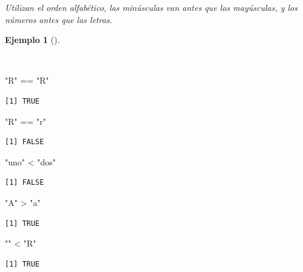 \documentclass[
  spanish,
  a4paper,
]{scrreport}
\newenvironment{Shaded}{\begin{snugshade}}{\end{snugshade}}
\newcommand{\SpecialCharTok}[1]{\textcolor[rgb]{0.37,0.37,0.37}{#1}}
\newcommand{\StringTok}[1]{\textcolor[rgb]{0.13,0.47,0.30}{#1}}
\theoremstyle{definition}
\theoremstyle{definition}
\newtheorem{example}{Ejemplo}[chapter]
\theoremstyle{remark}
\begin{document}
\emph{Utilizan el orden alfabético, las minúsculas van antes que las
mayúsculas, y los números antes que las letras.}

\begin{example}[]\protect\hypertarget{exm-operaciones-comparacion-cadenas}{}\label{exm-operaciones-comparacion-cadenas}

~

\begin{Shaded}
\begin{Highlighting}[]
\StringTok{"R"} \SpecialCharTok{==} \StringTok{"R"}
\end{Highlighting}
\end{Shaded}

\begin{verbatim}
[1] TRUE
\end{verbatim}

\begin{Shaded}
\begin{Highlighting}[]
\StringTok{"R"} \SpecialCharTok{==} \StringTok{"r"}
\end{Highlighting}
\end{Shaded}

\begin{verbatim}
[1] FALSE
\end{verbatim}

\begin{Shaded}
\begin{Highlighting}[]
\StringTok{"uno"} \SpecialCharTok{\textless{}} \StringTok{"dos"}
\end{Highlighting}
\end{Shaded}

\begin{verbatim}
[1] FALSE
\end{verbatim}

\begin{Shaded}
\begin{Highlighting}[]
\StringTok{"A"} \SpecialCharTok{\textgreater{}} \StringTok{"a"}
\end{Highlighting}
\end{Shaded}

\begin{verbatim}
[1] TRUE
\end{verbatim}

\begin{Shaded}
\begin{Highlighting}[]
\StringTok{""} \SpecialCharTok{\textless{}} \StringTok{"R"}
\end{Highlighting}
\end{Shaded}

\begin{verbatim}
[1] TRUE
\end{verbatim}

\end{example}
\end{document}
